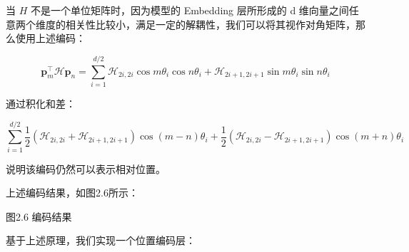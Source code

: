 \documentclass[12pt,a4paper]{book}
\begin{document}
当 \(H\) 不是一个单位矩阵时，因为模型的 Embedding 层所形成的 d
维向量之间任意两个维度的相关性比较小，满足一定的解耦性，我们可以将其视作对角矩阵，那么使用上述编码：

\[
\begin{equation}\boldsymbol{p}_m^{\top} \boldsymbol{\mathcal{H}} \boldsymbol{p}_n=\sum_{i=1}^{d/2} \boldsymbol{\mathcal{H}}_{2i,2i} \cos m\theta_i \cos n\theta_i + \boldsymbol{\mathcal{H}}_{2i+1,2i+1} \sin m\theta_i \sin n\theta_i\end{equation}
\]

通过积化和差：

\[
\begin{equation}\sum_{i=1}^{d/2} \frac{1}{2}\left(\boldsymbol{\mathcal{H}}_{2i,2i} + \boldsymbol{\mathcal{H}}_{2i+1,2i+1}\right) \cos (m-n)\theta_i + \frac{1}{2}\left(\boldsymbol{\mathcal{H}}_{2i,2i} - \boldsymbol{\mathcal{H}}_{2i+1,2i+1}\right) \cos (m+n)\theta_i \end{equation}
\]

说明该编码仍然可以表示相对位置。

上述\hspace{0pt}编码结果，如图2.6所示：

图2.6 编码结果

基于上述原理，我们实现一个\hspace{0pt}位置编码层：
\end{document}
